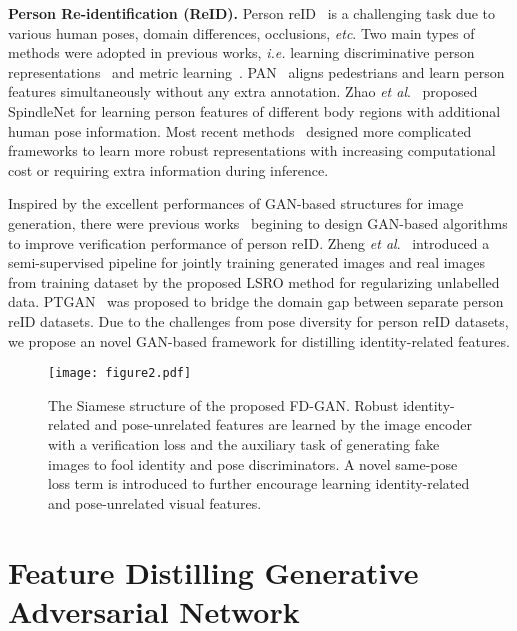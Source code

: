 \documentclass{article}
\newcommand{\etal}{\textit{et al}.}
\begin{document}
\textbf{Person Re-identification (ReID).} 
Person reID~\cite{Wu_2017_ICCV,Su_2017_ICCV,Chung_2017_ICCV,Yu_2017_ICCV,shen2018deep,shen2018end,
shen2018person,Chen_2018_CVPR} is a challenging task due to various human poses, domain differences, occlusions, \textit{etc}.
Two main types of methods were adopted in previous works, \textit{i.e.} learning discriminative person representations~\cite{xiao2016learning,cheng2016person,shi2015transferring} and metric learning~\cite{Yu_2017_ICCV,Zhang_2016_CVPR,Liu_2017_ICCV,Bak_2017_CVPR}.
PAN~\cite{zheng2017pedestrian} aligns pedestrians and learn person features simultaneously without any extra annotation.
Zhao \etal~\cite{zhao2017spindle} proposed SpindleNet for learning person features of different body regions with additional human pose information.
Most recent methods~\cite{zheng2017pedestrian,Yu_2017_ICCV,Zhang_2016_CVPR,Liu_2017_ICCV,Bak_2017_CVPR,chen2016similarity,liao2015person,li2014deepreid,li2017learning} designed more complicated frameworks to learn more robust representations with increasing computational cost or requiring extra information during inference.

Inspired by the excellent performances of GAN-based structures for image generation, there were previous works~\cite{zheng2017unlabeled,tran2017disentangled,wei2017person} begining to design GAN-based algorithms to improve verification performance of person reID.
Zheng \etal~\cite{zheng2017unlabeled} introduced a semi-supervised pipeline for jointly training generated images and real images from training dataset by the proposed LSRO method for regularizing unlabelled data.
PTGAN~\cite{wei2017person} was proposed to bridge the domain gap between separate person reID datasets.
Due to the challenges from pose diversity for person reID datasets, we propose an novel GAN-based framework for distilling identity-related features.

\begin{figure}[tb] 
\centering
\texttt{[image: figure2.pdf]}
\caption{The Siamese structure of the proposed FD-GAN. Robust identity-related and pose-unrelated features are learned by the image encoder  with a verification loss and the auxiliary task of generating fake images to fool identity and pose discriminators. A novel same-pose loss term is introduced to further encourage learning identity-related and pose-unrelated visual features.
}
\label{fig:overview}
\end{figure}

\section{Feature Distilling Generative Adversarial Network}
\label{method}
\end{document}
